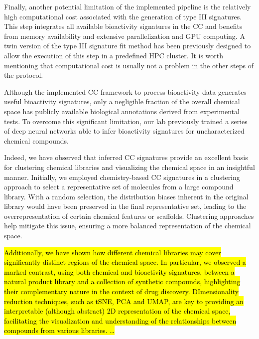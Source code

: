 Finally, another potential limitation of the implemented pipeline is the relatively high computational cost associated with the generation of type III signatures. This step integrates all available bioactivity signatures in the CC and benefits from memory availability and extensive parallelization and GPU computing. A twin version of the type III signature fit method has been previously designed to allow the execution of this step in a predefined HPC cluster. It is worth mentioning that computational cost is usually not a problem in the other steps of the protocol.  


Although the implemented CC framework to process bioactivity data generates useful bioactivity signatures, only a negligible fraction of the overall chemical space has publicly available biological annotations derived from experimental tests. To overcome this significant limitation, our lab previously trained a series of deep neural networks able to infer bioactivity signatures for uncharacterized chemical compounds. 

Indeed, we have observed that inferred CC signatures provide an excellent basis for clustering chemical libraries and visualizing the chemical space in an insightful manner. Initially, we employed chemistry-based CC signatures in a clustering approach to select a representative set of molecules from a large compound library. With a random selection, the distribution biases inherent in the original library would have been preserved in the final representative set, leading to the overrepresentation of certain chemical features or scaffolds. Clustering approaches help mitigate this issue, ensuring a more balanced representation of the chemical space. 

\hl{Additionally, we have shown how different chemical libraries may cover significantly distinct regions of the chemical space. In particular, we observed a marked contrast, using both chemical and bioactivity signatures, between a natural product library and a collection of synthetic compounds, highlighting their complementary nature in the context of drug discovery. DImensionality reduction techniques, such as tSNE, PCA and UMAP, are key to providing an interpretable (although abstract) 2D representation of the chemical space, facilitating the visualization and understanding of the relationships between compounds from various libraries. …  }

